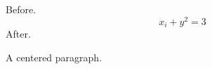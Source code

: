 \documentclass{article}
\def\openmath{\[}
\def\closemath{\]\ignorespaces}
\def\opencenter{\begin{center}}
\def\closecenter{\end{center}}
\begin{document}
Before.
\openmath
  x_i + y^2 = 3
\closemath
After.
\opencenter
  A centered paragraph.
\closecenter
\end{document}
